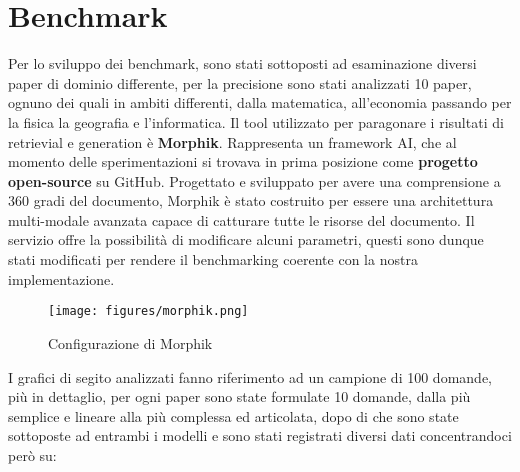 \section{Benchmark}
Per lo sviluppo dei benchmark, sono stati sottoposti ad esaminazione diversi paper di dominio differente, per la precisione sono stati analizzati 10 paper, ognuno dei quali in ambiti differenti, dalla matematica, all'economia passando per la fisica la geografia e l'informatica. Il tool utilizzato per paragonare i risultati di retrievial e generation è \textbf{Morphik}. Rappresenta un framework AI, che al momento delle sperimentazioni si trovava in prima posizione come \textbf{progetto open-source} su GitHub. Progettato e sviluppato per avere una comprensione a 360 gradi del documento, Morphik è stato costruito per essere una architettura multi-modale avanzata capace di catturare tutte le risorse del documento. Il servizio offre la possibilità di modificare alcuni parametri, questi sono dunque stati modificati per rendere il benchmarking coerente con la nostra implementazione.
\begin{figure}[H]
\centering
\texttt{[image: figures/morphik.png]}
\caption{Configurazione di Morphik}
\end{figure}

I grafici di segito analizzati fanno riferimento ad un campione di 100 domande, più in dettaglio, per ogni paper sono state formulate 10 domande, dalla più semplice e lineare alla più complessa ed articolata, dopo di che sono state sottoposte ad entrambi i modelli e sono stati registrati diversi dati concentrandoci però su:
\clearpage
